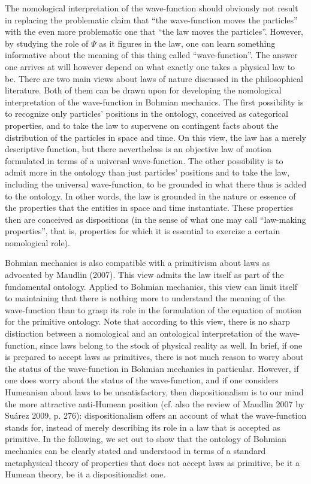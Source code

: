 \documentclass[12pt,a4paper]{article}
\theoremstyle{definition}
\begin{document}
The nomological interpretation of the wave-function should obviously not result in replacing the problematic claim that ``the wave-function moves the particles'' with the even more problematic one that ``the law moves the particles''. However, by studying the role of $\Psi$ as it figures in the law, one can learn something informative about the meaning of this thing called ``wave-function''. The answer one arrives at will however depend on what exactly one takes a physical law to be. There are two main views about laws of nature discussed in the philosophical literature. Both of them can be drawn upon for developing the nomological interpretation of the wave-function in Bohmian mechanics. The first possibility is to recognize only particles' positions in the ontology, conceived as categorical properties, and to take the law to supervene on contingent facts about the distribution of the particles in space and time. On this view, the law has a merely descriptive function, but there nevertheless is an objective law of motion formulated in terms of a universal wave-function. The other possibility is to admit more in the ontology than just particles' positions and to take the law, including the universal wave-function, to be grounded in what there thus is added to the ontology. In other words, the law is grounded in the nature or essence of the properties that the entities in space and time instantiate. These properties then are conceived as dispositions (in the sense of what one may call ``law-making properties'', that is, properties for which it is essential to exercize a certain nomological role).

Bohmian mechanics is also compatible with a primitivism about laws as advocated by Maudlin (2007). This view admits the law itself as part of the fundamental ontology. Applied to Bohmian mechanics, this view can limit itself to maintaining that there is nothing more to understand the meaning of the wave-function than to grasp its role in the formulation of the equation of motion for the primitive ontology. Note that according to this view, there is no sharp distinction between a nomological and an ontological interpretation of the wave-function, since laws belong to the stock of physical reality as well. In brief, if one is prepared to accept laws as primitives, there is not much reason to worry about the status of the wave-function in Bohmian mechanics in particular. However, if one does worry about the status of the wave-function, and if one considers Humeanism about laws to be unsatisfactory, then dispositionalism is to our mind the more attractive anti-Humean position (cf. also the review of Maudlin 2007 by Su\'arez 2009, p. 276): dispositionalism offers an account of what the wave-function stands for, instead of merely describing its role in a law that is accepted as primitive. In the following, we set out to show that the ontology of Bohmian mechanics can be clearly stated and understood in terms of a standard metaphysical theory of properties that does not accept laws as primitive, be it a Humean theory, be it a dispositionalist one.
\end{document}
